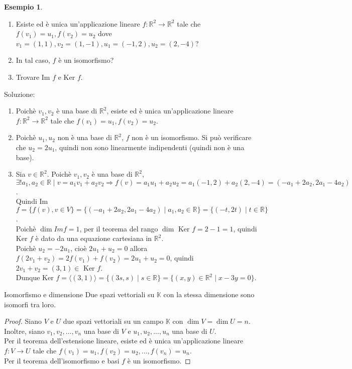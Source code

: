 \documentclass[a4paper]{article}
\theoremstyle{definition}
\newtheorem*{es}{Esempio}
\begin{document}
\begin{es}
	\begin{enumerate}
		\item Esiste ed è unica un'applicazione lineare $f: \mathbb{R}^2 \rightarrow \mathbb{R}^2$ tale che $f(v_1) = u_1, f(v_2) = u_2$ dove $v_1 = (1, 1), v_2 = (1, -1), u_1 = (-1, 2), u_2 = (2, -4)$?
		\item In tal caso, $f$ è un isomorfismo?
		\item Trovare Im $f$ e Ker $f$.
	\end{enumerate}
	Soluzione:
	\begin{enumerate}
		\item Poichè $v_1, v_2$ è una base di $\mathbb{R}^2$, esiste ed è unica un'applicazione lineare $f: \mathbb{R}^2 \rightarrow \mathbb{R}^2$ tale che $f(v_1) = u_1, f(v_2) = u_2$.
		\item Poichè $u_1, u_2$ non è una base di $\mathbb{R}^2$, $f$ non è un isomorfismo. Si può verificare che $u_2 = 2u_1$, quindi non sono linearmente indipendenti (quindi non è una base).
		\item Sia $v \in \mathbb{R}^2$. Poichè $v_1, v_2$ è una base di $\mathbb{R}^2$, $\exists! a_1, a_2 \in \mathbb{R} \mid v = a_1v_1 + a_2v_2 \Rightarrow f(v) = a_1u_1 + a_2u_2 = a_1(-1, 2) + a_2(2, -4) = (-a_1 + 2a_2, 2a_1 - 4a_2)$. \\
		      Quindi Im $f = \{f(v), v \in V\} = \{(-a_1 + 2a_2, 2a_1 - 4a_2) \mid a_1, a_2 \in \mathbb{R}\} = \{(-t, 2t) \mid t \in \mathbb{R}\}$. \\
		      Poichè $\dim Im f = 1$, per il teorema del rango $\dim$ Ker $f = 2 - 1 = 1$, quindi Ker $f$ è dato da una equazione cartesiana in $\mathbb{R}^2$. \\
		      Poichè $u_2 = -2u_1$, cioè $2u_1 + u_2 = 0$ allora $f(2v_1 + v_2) = 2f(v_1) + f(v_2) = 2u_1 + u_2 = 0$, quindi $2v_1 + v_2 = (3, 1) \in$ Ker $f$. \\
		      Dunque Ker $f = \langle (3, 1) \rangle = \{(3s, s) \mid s \in \mathbb{R}\} = \{(x, y) \in \mathbb{R}^2 \mid x - 3y = 0\}$.
	\end{enumerate}
\end{es}

\begin{cor}{Isomorfismo e dimensione}{}
	Due spazi vettoriali su $\mathbb{K}$ con la stessa dimensione sono isomorfi tra loro.
\end{cor}
\begin{proof}
	Siano $V$ e $U$ due spazi vettoriali su un campo $\mathbb{K}$ con $\dim V = \dim U = n$.
	Inoltre, siano $v_1, v_2, ..., v_n$ una base di $V$ e $u_1, u_2, ..., u_n$ una base di $U$. \\
	Per il teorema dell'estensione lineare, esiste ed è unica un'applicazione lineare $f: V \rightarrow U$ tale che $f(v_1) = u_1, f(v_2) = u_2, ..., f(v_n) = u_n$. \\
	Per il teorema dell'isomorfismo e basi $f$ è un isomorfismo.
\end{proof}
\end{document}
